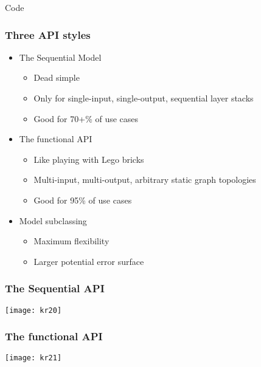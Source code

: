 \begin{frame}
  \begin{center}
    {\Large Code}
    
  \end{center}
\end{frame}

\begin{frame}[fragile] \frametitle{Three API styles}

\begin{itemize}
\item   The Sequential Model
\begin{itemize}
\item   Dead simple
\item   Only for single-input, single-output, sequential layer stacks
\item   Good for 70+\% of use cases
\end{itemize}
\item   The functional API
\begin{itemize}
\item   Like playing with Lego bricks
\item    Multi-input, multi-output, arbitrary static graph topologies
\item   Good for 95\% of use cases
\end{itemize}
\item   Model subclassing
\begin{itemize}
\item    Maximum flexibility
\item    Larger potential error surface
\end{itemize}
\end{itemize}
\end{frame}

\begin{frame}[fragile] \frametitle{The Sequential API}
\begin{center}
\texttt{[image: kr20]}
\end{center}
\end{frame}

\begin{frame}[fragile] \frametitle{The functional API}
\begin{center}
\texttt{[image: kr21]}
\end{center}
\end{frame}

